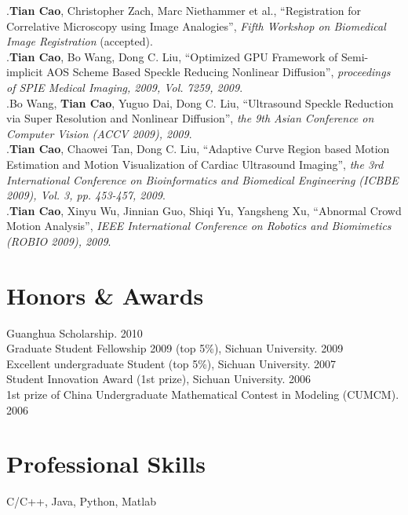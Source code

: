 \documentclass[line,margin]{res}
\begin{document}
\begin{resume}
[1].\textbf{Tian Cao}, Christopher Zach, Marc Niethammer et al., ``Registration for Correlative Microscopy using Image Analogies'',  \emph{Fifth Workshop on Biomedical Image Registration} (accepted).\vspace{.1in}\\
\smallskip
[2].\textbf{Tian Cao}, Bo Wang, Dong C. Liu, ``Optimized GPU Framework of Semi-implicit AOS
Scheme Based Speckle Reducing Nonlinear Diﬀusion'',  \emph{proceedings of SPIE Medical Imaging, 2009, Vol. 7259, 2009}.\vspace{.1in}\\
\smallskip
[3].Bo Wang, \textbf{Tian Cao}, Yuguo Dai, Dong C. Liu, ``Ultrasound Speckle Reduction via Super Resolution and Nonlinear Diffusion'',  \emph{the 9th Asian Conference on Computer Vision (ACCV 2009), 2009}. \vspace{.1in}\\
\smallskip
[4].\textbf{Tian Cao}, Chaowei Tan, Dong C. Liu, ``Adaptive Curve Region based Motion Estimation and Motion Visualization of Cardiac Ultrasound Imaging'',  \emph{the 3rd International Conference on Bioinformatics and Biomedical Engineering (ICBBE 2009), Vol. 3, pp. 453-457, 2009}.\vspace{.1in}\\
\smallskip
[5].\textbf{Tian Cao}, Xinyu Wu, Jinnian Guo, Shiqi Yu, Yangsheng Xu, ``Abnormal Crowd Motion Analysis'', \emph{IEEE International Conference on Robotics and Biomimetics (ROBIO 2009), 2009}.

 
\section{\sc Honors \& Awards}
\smallskip


Guanghua Scholarship.  \hfill       2010\vspace{.1in}\\
Graduate Student Fellowship 2009 (top 5\%), Sichuan University.  \hfill       2009\vspace{.1in}\\
Excellent undergraduate Student (top 5\%), Sichuan University.  \hfill       2007\vspace{.1in}\\
Student Innovation Award (1st prize), Sichuan University.  \hfill       2006\vspace{.1in}\\
1st prize of China Undergraduate Mathematical Contest in Modeling (CUMCM).  \hfill       2006

\section{\sc Professional Skills}
\smallskip

C/C++, Java, Python, Matlab %

\end{resume}

%
%
\end{document}
